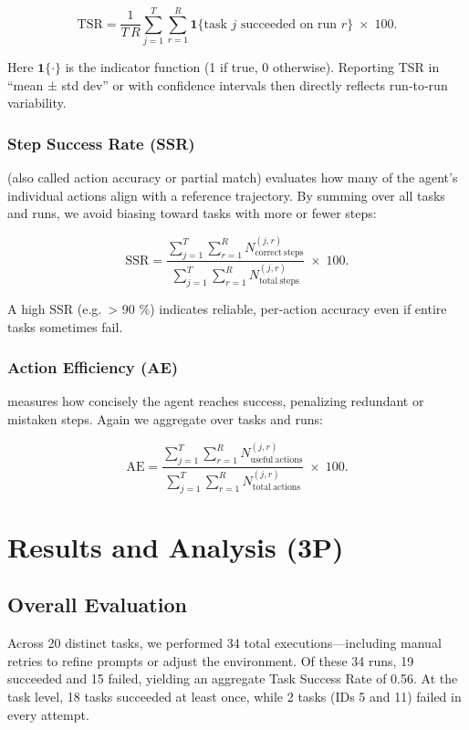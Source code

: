 \documentclass[runningheads]{llncs}
\begin{document}
\[
\text{TSR}
= \frac{1}{T\,R}
  \sum_{j=1}^{T}\sum_{r=1}^{R}
    \mathbf{1}\{\text{task }j\text{ succeeded on run }r\}
  \;\times\;100.
\]

Here \(\mathbf{1}\{\cdot\}\) is the indicator function (1 if true, 0 otherwise).  Reporting TSR in “mean ± std dev” or with confidence intervals then directly reflects run‐to‐run variability.

\subsubsection{Step Success Rate (SSR)} (also called action accuracy or partial match) evaluates how many of the agent’s individual actions align with a reference trajectory.  By summing over all tasks and runs, we avoid biasing toward tasks with more or fewer steps:

\[
\text{SSR}
= \frac{
    \sum_{j=1}^{T}\sum_{r=1}^{R} N^{(j,r)}_{\mathrm{correct\ steps}}
  }{
    \sum_{j=1}^{T}\sum_{r=1}^{R} N^{(j,r)}_{\mathrm{total\ steps}}
  }
  \;\times\;100.
\]

A high SSR (e.g.\ > 90 \%) indicates reliable, per‐action accuracy even if entire tasks sometimes fail.

\subsubsection{Action Efficiency (AE)}\label{sssec:AE} measures how concisely the agent reaches success, penalizing redundant or mistaken steps.  Again we aggregate over tasks and runs:

\[
\text{AE}
= \frac{
    \sum_{j=1}^{T}\sum_{r=1}^{R} N^{(j,r)}_{\mathrm{useful\ actions}}
  }{
    \sum_{j=1}^{T}\sum_{r=1}^{R} N^{(j,r)}_{\mathrm{total\ actions}}
  }
  \;\times\;100.
\]
\section{Results and Analysis (3P) } 

\subsection{Overall Evaluation}

Across 20 distinct tasks, we performed 34 total executions—including manual retries to refine prompts or adjust the environment. Of these 34 runs, 19 succeeded and 15 failed, yielding an aggregate Task Success Rate of 0.56. At the task level, 18 tasks succeeded at least once, while 2 tasks (IDs 5 and 11) failed in every attempt.
\end{document}
